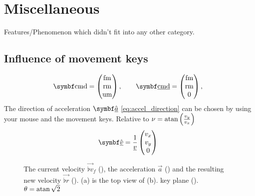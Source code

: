 \section{Miscellaneous}
\label{sec:misc}
Features/Phenomenon which didn't fit into any other category.


\subsection{Influence of movement keys}
\label{sec:movementkeys}
\begin{align*}
\vec{\cmd} =
\begin{pmatrix}
\fmove \\ \rmove \\ \umove
\end{pmatrix}, \qquad \vec{\flat{\cmd}} =
\begin{pmatrix}
\fmove \\ \rmove \\ 0
\end{pmatrix},
\end{align*}
The direction of acceleration $\uvec{\flat{a}}$ \eqref{eq:accel_direction} can be chosen by using your mouse and the movement keys. Relative to $\nu = \operatorname{atan}\left(\frac{v_y}{v_x}\right)$
\begin{align*}
\uvec{\flat{v}} = \frac{1}{\flat{v}}
\begin{pmatrix}
v_x \\ v_y \\ 0
\end{pmatrix}
\end{align*}

\begin{figure}[H]
	\centering
	\begin{subfigure}[t]{.5\textwidth}
		\centering
		\setlength\figureheight{5.5cm}
		\setlength\figurewidth{5.5cm}
		\caption{}
	\end{subfigure}%
	\begin{subfigure}[t]{.5\textwidth}
		\centering
		\setlength\figureheight{5.5cm}
		\setlength\figurewidth{5.5cm}
		\caption{}
	\end{subfigure}%
	\caption{The current velocity $\vec{\flat{v}}_f$ (\yellowarrow), the acceleration $\vec{a}$ (\orangearrow) and the resulting new velocity $\vec{\flat{r}}$ (\bluearrow). (a) is the top view of (b). key plane (\lightorangearea). $\theta = \operatorname{atan}\sqrt{2}$}
	\label{fig:cmd}
\end{figure}

